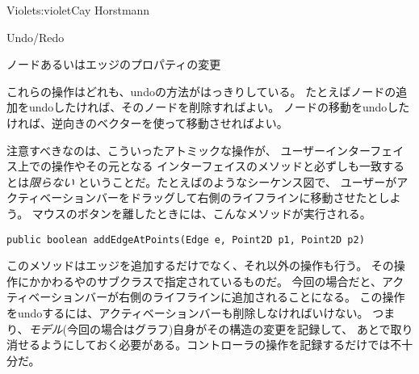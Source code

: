 \begin{aosachapter}{Violet}{s:violet}{Cay Horstmann}
\begin{aosasect1}{Undo/Redo}
\begin{aosaitemize}
  \item ノードあるいはエッジのプロパティの変更

\end{aosaitemize}

これらの操作はどれも、undoの方法がはっきりしている。
たとえばノードの追加をundoしたければ、そのノードを削除すればよい。
ノードの移動をundoしたければ、逆向きのベクターを使って移動させればよい。


注意すべきなのは、こういったアトミックな操作が、
ユーザーインターフェイス上での操作やその元となる
インターフェイスのメソッドと必ずしも一致するとは\emph{限らない}
ということだ。たとえばのようなシーケンス図で、
ユーザーがアクティベーションバーをドラッグして右側のライフラインに移動させたとしよう。
マウスのボタンを離したときには、こんなメソッドが実行される。

\begin{verbatim}
public boolean addEdgeAtPoints(Edge e, Point2D p1, Point2D p2)
\end{verbatim}

\noindent
このメソッドはエッジを追加するだけでなく、それ以外の操作も行う。
その操作にかかわるやのサブクラスで指定されているものだ。
今回の場合だと、アクティベーションバーが右側のライフラインに追加されることになる。
この操作をundoするには、アクティベーションバーも削除しなければいけない。
つまり、\emph{モデル}(今回の場合はグラフ)自身がその構造の変更を記録して、
あとで取り消せるようにしておく必要がある。コントローラの操作を記録するだけでは不十分だ。


\end{aosasect1}
\end{aosachapter}
